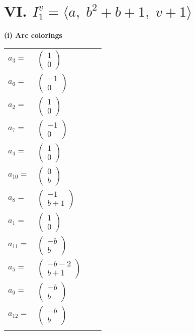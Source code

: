 \documentclass[1p]{elsarticle_modified}
\theoremstyle{definition}
\begin{document}
\centering \section*{VI. $I^v_{1}= \langle a,\;b^2+b+1,\;v+1 \rangle$}
\flushleft \textbf{(i) Arc colorings}\\
\begin{tabular}{m{7pt} m{180pt} m{7pt} m{180pt} }
\flushright $a_{3}=$&$\begin{pmatrix}1\\0\end{pmatrix}$ \\
\flushright $a_{6}=$&$\begin{pmatrix}-1\\0\end{pmatrix}$ \\
\flushright $a_{2}=$&$\begin{pmatrix}1\\0\end{pmatrix}$ \\
\flushright $a_{7}=$&$\begin{pmatrix}-1\\0\end{pmatrix}$ \\
\flushright $a_{4}=$&$\begin{pmatrix}1\\0\end{pmatrix}$ \\
\flushright $a_{10}=$&$\begin{pmatrix}0\\b\end{pmatrix}$ \\
\flushright $a_{8}=$&$\begin{pmatrix}-1\\b+1\end{pmatrix}$ \\
\flushright $a_{1}=$&$\begin{pmatrix}1\\0\end{pmatrix}$ \\
\flushright $a_{11}=$&$\begin{pmatrix}- b\\b\end{pmatrix}$ \\
\flushright $a_{5}=$&$\begin{pmatrix}- b-2\\b+1\end{pmatrix}$ \\
\flushright $a_{9}=$&$\begin{pmatrix}- b\\b\end{pmatrix}$ \\
\flushright $a_{12}=$&$\begin{pmatrix}- b\\b\end{pmatrix}$\\&\end{tabular}
\end{document}
